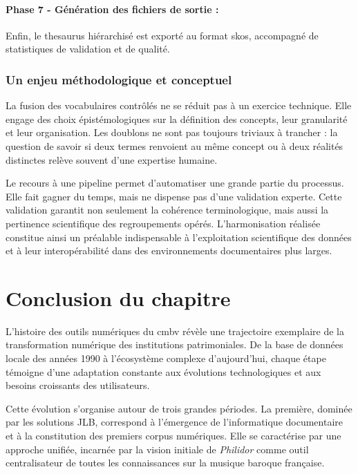 \paragraph{Phase 7 - Génération des fichiers de sortie :}  
Enfin, le \gls{thesaurus} hiérarchisé est exporté au format \gls{skos}, accompagné de statistiques de validation et de qualité.

\subsubsection{Un enjeu méthodologique et conceptuel}

La fusion des vocabulaires contrôlés ne se réduit pas à un exercice technique. Elle engage des choix épistémologiques sur la définition des concepts, leur granularité et leur organisation. Les doublons ne sont pas toujours triviaux à trancher : la question de savoir si deux termes renvoient au même concept ou à deux réalités distinctes relève souvent d’une expertise humaine.  

Le recours à une pipeline  permet d’automatiser une grande partie du processus. Elle fait gagner du temps, mais ne dispense pas d’une validation experte. Cette validation garantit non seulement la cohérence terminologique, mais aussi la pertinence scientifique des regroupements opérés. L’harmonisation réalisée constitue ainsi un préalable indispensable à l’exploitation scientifique des données et à leur interopérabilité dans des environnements documentaires plus larges.


\section*{Conclusion du chapitre}

L'histoire des outils numériques du \gls{cmbv} révèle une trajectoire exemplaire de la transformation numérique des institutions patrimoniales. De la base de données locale des années 1990 à l'écosystème complexe d'aujourd'hui, chaque étape témoigne d'une adaptation constante aux évolutions technologiques et aux besoins croissants des utilisateurs.

Cette évolution s'organise autour de trois grandes périodes. La première, dominée par les solutions JLB, correspond à l'émergence de l'informatique documentaire et à la constitution des premiers corpus numériques. Elle se caractérise par une approche unifiée, incarnée par la vision initiale de \textit{Philidor} comme outil centralisateur de toutes les connaissances sur la musique baroque française.

